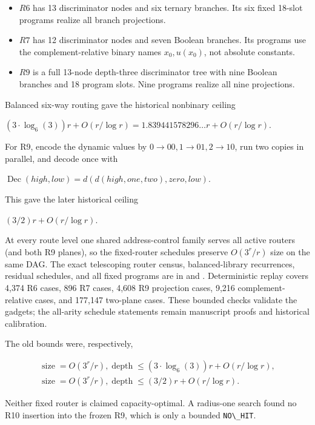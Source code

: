 \documentclass[
  11pt,
]{article}
\newcommand{\passthrough}[1]{#1}
\providecommand{\tightlist}{%
  \setlength{\itemsep}{0pt}\setlength{\parskip}{0pt}}
\theoremstyle{definition}
\theoremstyle{remark}
\begin{document}
\begin{itemize}
\tightlist
\item
  \(R6\) has 13 discriminator nodes and six ternary branches. Its six
  fixed 18-slot programs realize all branch projections.
\item
  \(R7\) has 12 discriminator nodes and seven Boolean branches. Its
  programs use the complement-relative binary names \(x_0,u(x_0)\), not
  absolute constants.
\item
  \(R9\) is a full 13-node depth-three discriminator tree with nine
  Boolean branches and 18 program slots. Nine programs realize all nine
  projections.
\end{itemize}

Balanced six-way routing gave the historical nonbinary ceiling

\((3\mathbin{\cdot}\log_6(3))r+O(r/\log r)=1.839441578296\ldots r+O(r/\log r)\).

For R9, encode the dynamic values by \(0\to 00,1\to 01,2\to 10\), run
two copies in parallel, and decode once with

\(\operatorname{Dec}(high,low)=d(d(high,one,two),zero,low)\).

This gave the later historical ceiling

\((3/2)r+O(r/\log r)\).

At every route level one shared address-control family serves all active
routers (and both R9 planes), so the fixed-router schedules preserve
\(O(3^r/r)\) size on the same DAG. The exact telescoping router census,
balanced-library recurrences, residual schedules, and all fixed programs
are in 
and .
Deterministic replay covers 4,374 R6 cases, 896 R7 cases, 4,608 R9
projection cases, 9,216 complement-relative cases, and 177,147 two-plane
cases. These bounded checks validate the gadgets; the all-arity schedule
statements remain manuscript proofs and historical calibration.

The old bounds were, respectively,

\[
\begin{aligned}
\operatorname{size}=O(3^r/r),  \operatorname{depth}\le (3\mathbin{\cdot}\log_6(3))r+O(r/\log r), \\
\operatorname{size}=O(3^r/r),  \operatorname{depth}\le (3/2)r+O(r/\log r).
\end{aligned}
\]

Neither fixed router is claimed capacity-optimal. A radius-one search
found no R10 insertion into the frozen R9, which is only a bounded
\passthrough{\lstinline!NO\_HIT!}.
\end{document}
